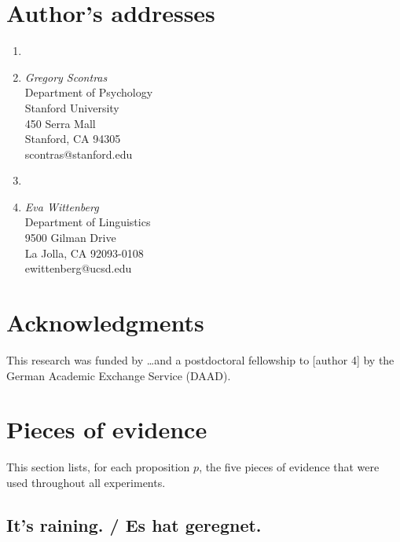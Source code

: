 \documentclass[11pt]{article}
\begin{document}
\section*{Author's addresses}
\begin{enumerate}
\item 
\item \emph{Gregory Scontras}\\ Department of Psychology\\ Stanford University\\ 450 Serra Mall\\ Stanford, CA 94305\\ scontras@stanford.edu
\item
\item \emph{Eva Wittenberg}\\ Department of Linguistics \\ 9500 Gilman Drive\\
La Jolla, CA 92093-0108\\ ewittenberg@ucsd.edu
\end{enumerate}


\section*{Acknowledgments}
This research was funded by \dots and a postdoctoral fellowship to [author 4] by the German Academic Exchange Service (DAAD).


   



\appendix

\section{Pieces of evidence}
\label{sec:evidence}

This section lists, for each proposition $p$, the five pieces of evidence that were used throughout all experiments.

\subsection{It's raining. / Es hat geregnet.}
\end{document}
